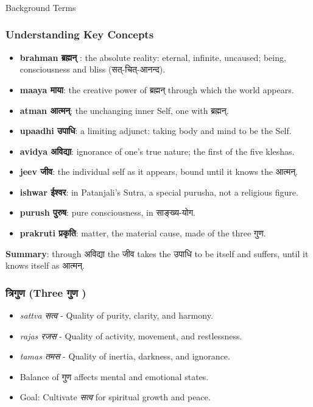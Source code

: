 \begin{frame}[fragile]\frametitle{}
\begin{center}
{\Large Background Terms}
\end{center}
\end{frame}

\begin{frame}[fragile,shrink=6]\frametitle{Understanding Key Concepts}
      \begin{itemize}
        \item \textbf{brahman ब्रह्मन् }: the absolute reality: eternal, infinite, uncaused; being, consciousness and bliss (सत्-चित्-आनन्द).
        \item \textbf{maaya माया}: the creative power of ब्रह्मन् through which the world appears.
        \item \textbf{atman आत्मन्}: the unchanging inner Self, one with ब्रह्मन्.
        \item \textbf{upaadhi उपाधि}: a limiting adjunct: taking body and mind to be the Self.
        \item \textbf{avidya अविद्या}: ignorance of one's true nature; the first of the five kleshas.
        \item \textbf{jeev जीव}: the individual self as it appears, bound until it knows the आत्मन्.
        \item \textbf{ishwar ईश्वर}: in Patanjali's Sutra, a special purusha, not a religious figure.
        \item \textbf{purush पुरुष}: pure consciousness, in साङ्ख्य-योग.
        \item \textbf{prakruti प्रकृति}: matter, the material cause, made of the three गुण.
      \end{itemize}

\textbf{Summary}: through अविद्या the जीव takes the उपाधि to be itself and suffers, until it knows itself as आत्मन्.
\end{frame}

\begin{frame}[fragile]\frametitle{त्रिगुण  (Three गुण )}

      \begin{itemize}
		\item \textit{sattva सत्व } - Quality of purity, clarity, and harmony.
		\item \textit{rajas रजस } - Quality of activity, movement, and restlessness.
		\item \textit{tamas तमस } - Quality of inertia, darkness, and ignorance.
		\item Balance of गुण  affects mental and emotional states.
		\item Goal: Cultivate \textit{सत्व} for spiritual growth and peace.
	  \end{itemize}

\end{frame}

